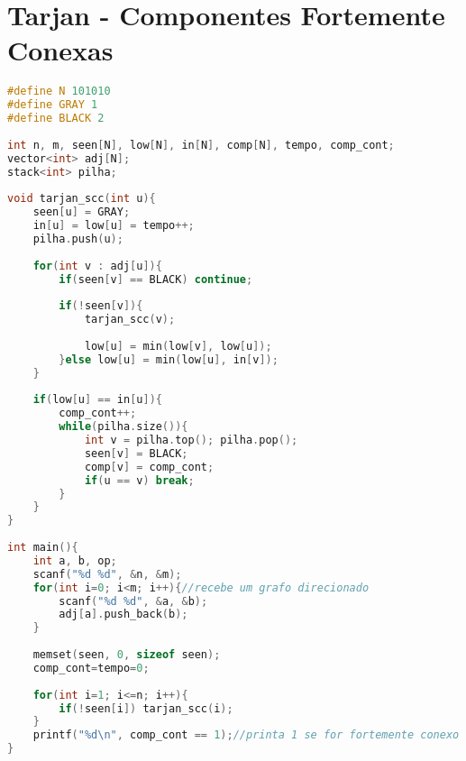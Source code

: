 \documentclass[12pt,a4paper,twoside]{report}
\begin{document}
\section{Tarjan - Componentes Fortemente Conexas}
\noindent\begin{lstlisting}[caption=Tarjan - Componentes Fortemente Conexas,language=C++]
#define N 101010
#define GRAY 1
#define BLACK 2
 
int n, m, seen[N], low[N], in[N], comp[N], tempo, comp_cont;
vector<int> adj[N];
stack<int> pilha;
 
void tarjan_scc(int u){
    seen[u] = GRAY;
    in[u] = low[u] = tempo++;
    pilha.push(u);
     
    for(int v : adj[u]){
        if(seen[v] == BLACK) continue;
         
        if(!seen[v]){
            tarjan_scc(v);
             
            low[u] = min(low[v], low[u]);
        }else low[u] = min(low[u], in[v]);
    }
     
    if(low[u] == in[u]){
        comp_cont++;
        while(pilha.size()){
            int v = pilha.top(); pilha.pop();
            seen[v] = BLACK;
            comp[v] = comp_cont;
            if(u == v) break;
        }
    }    
}
 
int main(){
    int a, b, op;
    scanf("%d %d", &n, &m);
    for(int i=0; i<m; i++){//recebe um grafo direcionado
        scanf("%d %d", &a, &b);
        adj[a].push_back(b);
    }
     
    memset(seen, 0, sizeof seen);
    comp_cont=tempo=0;
     
    for(int i=1; i<=n; i++){
        if(!seen[i]) tarjan_scc(i);
    }
    printf("%d\n", comp_cont == 1);//printa 1 se for fortemente conexo
}
\end{lstlisting}
\end{document}
